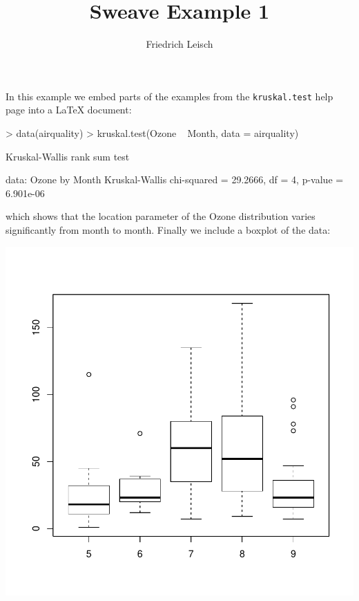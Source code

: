 \documentclass[a4paper]{article}
\title{Sweave Example 1} \author{Friedrich Leisch}
\begin{document}
 \maketitle
In this example we embed parts of the examples from the \texttt{kruskal.test} help page into a \LaTeX{} document:
\begin{Schunk}
\begin{Sinput}
> data(airquality)
> kruskal.test(Ozone ~ Month, data = airquality)
\end{Sinput}
\begin{Soutput}
	Kruskal-Wallis rank sum test

data:  Ozone by Month 
Kruskal-Wallis chi-squared = 29.2666, df = 4, p-value = 6.901e-06
\end{Soutput}
\end{Schunk}
which shows that the location parameter of the Ozone
distribution varies significantly from month to month. Finally we include a boxplot of the data:
\begin{center}
\includegraphics{test_sweave-002}
\end{center}
\end{document}
